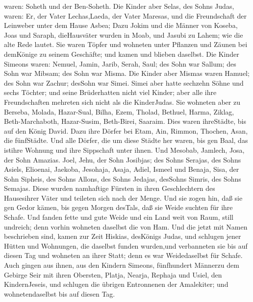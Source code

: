 waren: Soheth und der Ben-Soheth.  Die Kinder aber Selas,
des Sohns Judas, waren: Er, der Vater Lechas,Laeda, der Vater Maresas,
und die Freundschaft der Leinweber unter dem Hause Asbea; 
Dazu Jokim und die Männer von Koseba, Joas und Saraph, dieHausväter
wurden in Moab, und Jasubi zu Lahem; wie die alte Rede lautet.
 Sie waren Töpfer und wohneten unter Pflanzen und Zäunen
bei demKönige zu seinem Geschäfte; und kamen und blieben daselbst.
 Die Kinder Simeons waren: Nemuel, Jamin, Jarib, Serah,
Saul;  des Sohn war Sallum; des Sohn war Mibsam; des Sohn
war Misma.  Die Kinder aber Mismas waren Hamuel; des Sohn
war Zachur; desSohn war Simei.  Simei aber hatte sechzehn
Söhne und sechs Töchter; und seine Brüderhatten nicht viel Kinder; aber
alle ihre Freundschaften mehreten sich nicht als die KinderJudas.
 Sie wohneten aber zu Berseba, Molada, Hazar-Sual,
 Bilha, Ezem, Tholad,  Bethuel, Harma, Ziklag,
 Beth-Marchaboth, Hazar-Susim, Beth-Birei, Saaraim. Dies
waren ihreStädte, bis auf den König David.  Dazu ihre
Dörfer bei Etam, Ain, Rimmon, Thochen, Asan, die fünfStädte.
 Und alle Dörfer, die um diese Städte her waren, bis gen
Baal, das istihre Wohnung und ihre Sippschaft unter ihnen. 
Und Mesobab, Jamlech, Josa, der Sohn Amazias.  Joel, Jehu,
der Sohn Josibjas; des Sohns Serajas, des Sohns Asiels, 
Elioenai, Jaekoba, Jesohaja, Asaja, Adiel, Ismeel und Benaja,
 Sisa, der Sohn Sipheis, des Sohns Allons, des Sohns
Jedajas, desSohns Simris, des Sohns Semajas.  Diese wurden
namhaftige Fürsten in ihren Geschlechtern des Hausesihrer Väter und
teileten sich nach der Menge.  Und sie zogen hin, daß sie
gen Gedor kämen, bis gegen Morgen desTals, daß sie Weide suchten für
ihre Schafe.  Und fanden fette und gute Weide und ein Land
weit von Raum, still undreich; denn vorhin wohneten daselbst die von
Ham.  Und die jetzt mit Namen beschrieben sind, kamen zur
Zeit Hiskias, desKönigs Judas, und schlugen jener Hütten und Wohnungen,
die daselbst funden wurden,und verbanneten sie bis auf diesen Tag und
wohneten an ihrer Statt; denn es war Weidedaselbst für Schafe.
 Auch gingen aus ihnen, aus den Kindern Simeons,
fünfhundert Männerzu dem Gebirge Seir mit ihren Obersten, Platja,
Nearja, Rephaja und Usiel, den KindernJeseis,  und schlugen
die übrigen Entronnenen der Amalekiter; und wohnetendaselbst bis auf
diesen Tag.

